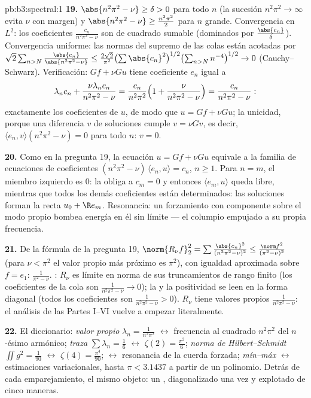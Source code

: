 \begin{solution}{pb:b3:spectral:1}
\textbf{19.} $\abs{n^2\pi^2 - \nu} \geq \delta > 0$ para todo $n$ (la
sucesión $n^2\pi^2 \to \infty$ evita $\nu$ con margen) y
$\abs{n^2\pi^2 - \nu} \geq \frac{n^2\pi^2}2$ para $n$ grande.
Convergencia en $L^2$: los coeficientes $\frac{c_n}{n^2\pi^2 - \nu}$ son
de cuadrado sumable (dominados por $\frac{\abs{c_n}}\delta$).
Convergencia uniforme: las normas del supremo de las colas están
acotadas por $\sqrt2\sum_{n>N}
\frac{\abs{c_n}}{\abs{n^2\pi^2 - \nu}} \leq
\frac{2\sqrt2}{\pi^2}\bigl(\sum\abs{c_n}^2\bigr)^{1/2}
\bigl(\sum_{n>N}n^{-4}\bigr)^{1/2} \to 0$ (Cauchy--Schwarz).
Verificación: $Gf + \nu Gu$ tiene coeficiente $e_n$ igual a
\[
\lambda_nc_n + \frac{\nu\lambda_nc_n}{n^2\pi^2 - \nu}
= \frac{c_n}{n^2\pi^2}\Bigl(1 + \frac{\nu}{n^2\pi^2 -
\nu}\Bigr) = \frac{c_n}{n^2\pi^2 - \nu} :
\]
exactamente los coeficientes de $u$, de modo que $u = Gf + \nu Gu$; la
unicidad, porque una diferencia $v$ de soluciones cumple $v = \nu
Gv$, es decir, $\langle e_n, v\rangle(n^2\pi^2 - \nu) = 0$ para todo
$n$: $v = 0$.

\textbf{20.} Como en la pregunta 19, la ecuación $u = Gf + \nu
Gu$ equivale a la familia de ecuaciones de coeficientes
$(n^2\pi^2 - \nu)\,\langle e_n, u\rangle = c_n$, $n \geq
1$. Para $n = m$, el miembro izquierdo es $0$: la
 obliga a $c_m = 0$ y
entonces $\langle e_m,
u\rangle$ queda libre, mientras que todos los demás coeficientes están
determinados: las soluciones forman la recta $u_0 + \R e_m$. Resonancia:
un forzamiento con componente sobre el modo propio bombea energía en él
sin límite --- el columpio empujado a su propia frecuencia.

\textbf{21.} De la fórmula de la pregunta 19, $\norm{R_\nu f}_2^2
= \sum\frac{\abs{c_n}^2}{(n^2\pi^2 - \nu)^2} \leq
\frac{\norm f^2}{(\pi^2 - \nu)^2}$ (para $\nu < \pi^2$ el valor propio
más próximo es $\pi^2$), con igualdad aproximada sobre $f = e_1$:
$\frac1{\pi^2 - \nu}$. : $R_\nu$ es límite en norma de sus
truncamientos de rango finito (los coeficientes de la cola son
$\frac1{n^2\pi^2 - \nu} \to 0$); la
 y la positividad se
leen en la forma diagonal (todos los coeficientes son
$\frac1{n^2\pi^2 - \nu} > 0$). $R_\nu$ tiene valores propios
$\frac1{n^2\pi^2 - \nu}$: el análisis de las Partes I--VI vuelve a
empezar literalmente.

\textbf{22.} El diccionario: \emph{valor propio} $\lambda_n =
\frac1{n^2\pi^2}$ $\leftrightarrow$ frecuencia al cuadrado $n^2\pi^2$
del $n$-ésimo armónico; \emph{traza} $\sum
\lambda_n = \frac16$ $\leftrightarrow$ $\zeta(2) =
\frac{\pi^2}6$; \emph{norma de Hilbert--Schmidt} $\iint g^2 =
\frac1{90}$ $\leftrightarrow$ $\zeta(4) = \frac{\pi^4}{90}$;
\emph{}
$\leftrightarrow$ resonancia de la cuerda forzada; \emph{mín--máx}
$\leftrightarrow$ estimaciones variacionales, hasta $\pi < 3.1437$ a
partir de un polinomio. Detrás de cada emparejamiento, el mismo objeto:
un  ,
diagonalizado una vez y explotado de cinco maneras.


\end{solution}
